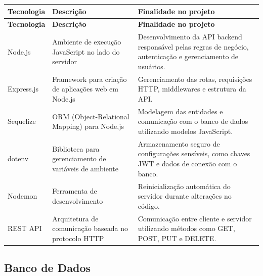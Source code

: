 \documentclass[12pt]{article}
\begin{document}
\begin{longtable}{|p{3cm}|p{4.2cm}|p{7cm}|}
  \hline
  \textbf{Tecnologia}                                    & \textbf{Descrição} & \textbf{Finalidade no projeto}  \\
  \hline
  \endfirsthead

  \hline
  \textbf{Tecnologia}                                    & \textbf{Descrição} & \textbf{Finalidade no projeto}  \\
  \hline
  \endhead

  Node.js                                                &
  Ambiente de execução JavaScript no lado do servidor    &
  Desenvolvimento da API backend responsável pelas regras de negócio, autenticação e gerenciamento de usuários. \\
  \hline

  Express.js                                             &
  Framework para criação de aplicações web em Node.js    &
  Gerenciamento das rotas, requisições HTTP, middlewares e estrutura da API.                                    \\
  \hline

  Sequelize                                              &
  ORM (Object-Relational Mapping) para Node.js           &
  Modelagem das entidades e comunicação com o banco de dados utilizando modelos JavaScript.                     \\
  \hline

  dotenv                                                 &
  Biblioteca para gerenciamento de variáveis de ambiente &
  Armazenamento seguro de configurações sensíveis, como chaves JWT e dados de conexão com o banco.              \\
  \hline

  Nodemon                                                &
  Ferramenta de desenvolvimento                          &
  Reinicialização automática do servidor durante alterações no código.                                          \\
  \hline

  REST API                                               &
  Arquitetura de comunicação baseada no protocolo HTTP   &
  Comunicação entre cliente e servidor utilizando métodos como GET, POST, PUT e DELETE.                         \\
  \hline
\end{longtable}

\subsection{Banco de Dados}
\end{document}
